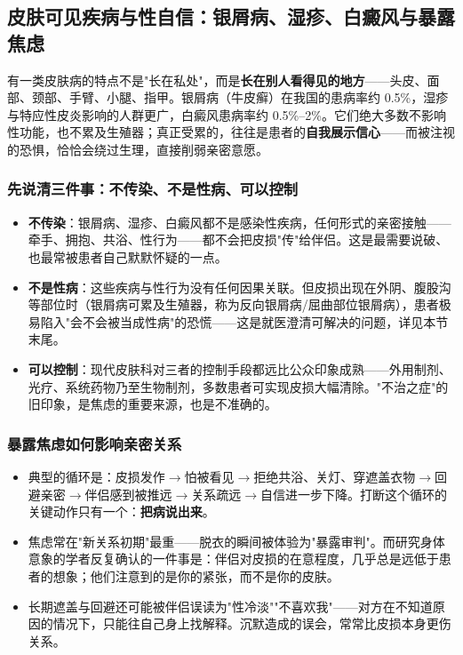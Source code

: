 \subsection{皮肤可见疾病与性自信：银屑病、湿疹、白癜风与暴露焦虑}

有一类皮肤病的特点不是"长在私处"，而是\textbf{长在别人看得见的地方}——头皮、面部、颈部、手臂、小腿、指甲。银屑病（牛皮癣）在我国的患病率约 0.5\%，湿疹与特应性皮炎影响的人群更广，白癜风患病率约 0.5\%--2\%。它们绝大多数不影响性功能，也不累及生殖器；真正受累的，往往是患者的\textbf{自我展示信心}——而被注视的恐惧，恰恰会绕过生理，直接削弱亲密意愿。

\subsubsection{先说清三件事：不传染、不是性病、可以控制}

\begin{itemize}
\item \textbf{不传染}：银屑病、湿疹、白癜风都不是感染性疾病，任何形式的亲密接触——牵手、拥抱、共浴、性行为——都不会把皮损"传"给伴侣。这是最需要说破、也最常被患者自己默默怀疑的一点。
\item \textbf{不是性病}：这些疾病与性行为没有任何因果关联。但皮损出现在外阴、腹股沟等部位时（银屑病可累及生殖器，称为反向银屑病/屈曲部位银屑病），患者极易陷入"会不会被当成性病"的恐慌——这是就医澄清可解决的问题，详见本节末尾。
\item \textbf{可以控制}：现代皮肤科对三者的控制手段都远比公众印象成熟——外用制剂、光疗、系统药物乃至生物制剂，多数患者可实现皮损大幅清除。"不治之症"的旧印象，是焦虑的重要来源，也是不准确的。
\end{itemize}

\subsubsection{暴露焦虑如何影响亲密关系}

\begin{itemize}
\item 典型的循环是：皮损发作$\rightarrow$怕被看见$\rightarrow$拒绝共浴、关灯、穿遮盖衣物$\rightarrow$回避亲密$\rightarrow$伴侣感到被推远$\rightarrow$关系疏远$\rightarrow$自信进一步下降。打断这个循环的关键动作只有一个：\textbf{把病说出来}。
\item 焦虑常在"新关系初期"最重——脱衣的瞬间被体验为"暴露审判"。而研究身体意象的学者反复确认的一件事是：伴侣对皮损的在意程度，几乎总是远低于患者的想象；他们注意到的是你的紧张，而不是你的皮肤。
\item 长期遮盖与回避还可能被伴侣误读为"性冷淡""不喜欢我"——对方在不知道原因的情况下，只能往自己身上找解释。沉默造成的误会，常常比皮损本身更伤关系。
\end{itemize}

